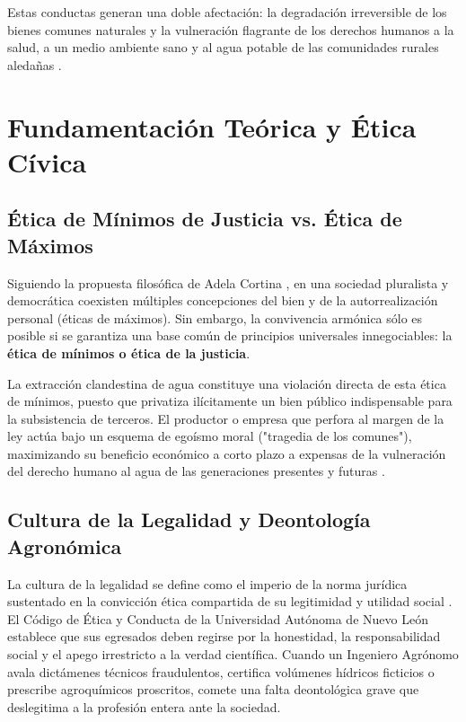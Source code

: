 Estas conductas generan una doble afectación: la degradación irreversible de los bienes comunes naturales y la vulneración flagrante de los derechos humanos a la salud, a un medio ambiente sano y al agua potable de las comunidades rurales aledañas \parencite{giusti2018}.

\section{Fundamentación Teórica y Ética Cívica}
\subsection{Ética de Mínimos de Justicia vs. Ética de Máximos}
Siguiendo la propuesta filosófica de Adela Cortina \parencite{cortina2013}, en una sociedad pluralista y democrática coexisten múltiples concepciones del bien y de la autorrealización personal (éticas de máximos). Sin embargo, la convivencia armónica sólo es posible si se garantiza una base común de principios universales innegociables: la \textbf{ética de mínimos o ética de la justicia}.

La extracción clandestina de agua constituye una violación directa de esta ética de mínimos, puesto que privatiza ilícitamente un bien público indispensable para la subsistencia de terceros. El productor o empresa que perfora al margen de la ley actúa bajo un esquema de egoísmo moral ("tragedia de los comunes"), maximizando su beneficio económico a corto plazo a expensas de la vulneración del derecho humano al agua de las generaciones presentes y futuras \parencite{giusti2018}.

\subsection{Cultura de la Legalidad y Deontología Agronómica}
La cultura de la legalidad se define como el imperio de la norma jurídica sustentado en la convicción ética compartida de su legitimidad y utilidad social \parencite{cndh2020}. El Código de Ética y Conducta de la Universidad Autónoma de Nuevo León \parencite{uanl_codigo2021} establece que sus egresados deben regirse por la honestidad, la responsabilidad social y el apego irrestricto a la verdad científica. Cuando un Ingeniero Agrónomo avala dictámenes técnicos fraudulentos, certifica volúmenes hídricos ficticios o prescribe agroquímicos proscritos, comete una falta deontológica grave que deslegitima a la profesión entera ante la sociedad.

